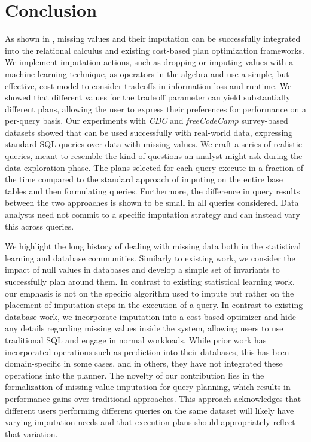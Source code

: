 \section{Conclusion}
As shown in \ProjectName{}, missing values and their imputation can be successfully integrated into the relational calculus and
existing cost-based plan optimization frameworks. We implement imputation actions, such as dropping or imputing values with a machine
learning technique, as operators in the algebra and use a simple, but effective, cost model to consider tradeoffs in 
information loss and runtime. We showed that different values for the tradeoff parameter can yield substantially
different plans, allowing the user to express their preferences for performance on a per-query basis.
Our experiments with \textit{CDC} and \textit{freeCodeCamp} survey-based datasets
showed that \ProjectName{} can be used successfully with real-world data, expressing standard SQL queries over data with missing values. 
We craft a series of realistic queries, meant to resemble the kind of questions an analyst might ask during
the data exploration phase. The plans selected for each query execute in a fraction of the time compared to the standard approach of imputing on the entire base tables and
then formulating queries. Furthermore, the difference in query results between the two approaches is
shown to be small in all queries considered. Data analysts need not commit to a specific imputation strategy and can instead
vary this across queries.

We highlight the long history of dealing with missing data both in the statistical learning and database communities.
Similarly to existing work, we consider the impact of null values in databases and develop a simple set of invariants to 
successfully plan around them. In contrast to existing statistical learning work, our emphasis is not on the specific algorithm
used to impute but rather on the placement of imputation steps in the execution of a query. In contrast to existing database work,
we incorporate imputation into a cost-based optimizer and hide any details
regarding missing values inside the system, allowing users to use traditional SQL and engage in normal workloads.
While prior work has incorporated operations such as prediction into their databases, this has been domain-specific
in some cases, and in others, they have not integrated these operations into the planner. The novelty
of our contribution lies in the formalization of missing value imputation for query planning, which results in performance
gains over traditional approaches. This approach acknowledges that different users performing different queries on the same
dataset will likely have varying imputation needs and that execution plans should appropriately reflect that variation.

